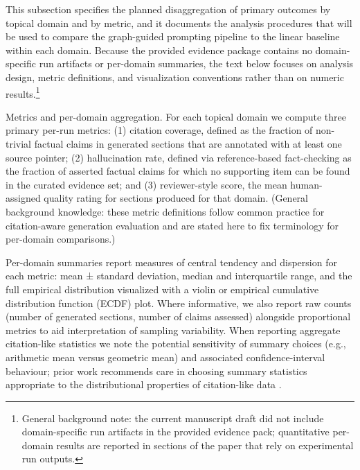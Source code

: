 This subsection specifies the planned disaggregation of primary outcomes by topical domain and by metric, and it documents the analysis procedures that will be used to compare the graph-guided prompting pipeline to the linear baseline within each domain. Because the provided evidence package contains no domain-specific run artifacts or per-domain summaries, the text below focuses on analysis design, metric definitions, and visualization conventions rather than on numeric results.\footnote{General background note: the current manuscript draft did not include domain-specific run artifacts in the provided evidence pack; quantitative per-domain results are reported in sections of the paper that rely on experimental run outputs.}

Metrics and per-domain aggregation. For each topical domain we compute three primary per-run metrics: (1) citation coverage, defined as the fraction of non-trivial factual claims in generated sections that are annotated with at least one source pointer; (2) hallucination rate, defined via reference-based fact-checking as the fraction of asserted factual claims for which no supporting item can be found in the curated evidence set; and (3) reviewer-style score, the mean human-assigned quality rating for sections produced for that domain. (General background knowledge: these metric definitions follow common practice for citation-aware generation evaluation and are stated here to fix terminology for per-domain comparisons.)

Per-domain summaries report measures of central tendency and dispersion for each metric: mean ± standard deviation, median and interquartile range, and the full empirical distribution visualized with a violin or empirical cumulative distribution function (ECDF) plot. Where informative, we also report raw counts (number of generated sections, number of claims assessed) alongside proportional metrics to aid interpretation of sampling variability. When reporting aggregate citation-like statistics we note the potential sensitivity of summary choices (e.g., arithmetic mean versus geometric mean) and associated confidence-interval behaviour; prior work recommends care in choosing summary statistics appropriate to the distributional properties of citation-like data \cite{web_thelwall_2015_the_precision_of_the_arithmetic_mean_geometric_m}.

